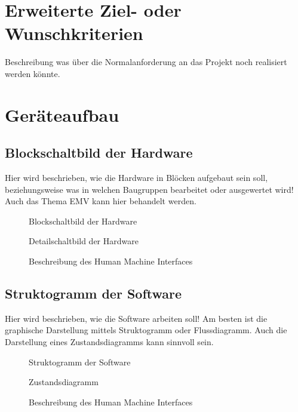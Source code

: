 \documentclass[12pt, draft]{article}
\begin{document}
\section{Erweiterte Ziel- oder Wunschkriterien}
Beschreibung was über die Normalanforderung an das Projekt noch realisiert werden könnte.

\section{Geräteaufbau}
\subsection{Blockschaltbild der Hardware}
Hier wird beschrieben, wie die Hardware in Blöcken aufgebaut sein soll, beziehungsweise was in welchen Baugruppen bearbeitet oder ausgewertet wird! \\
Auch das Thema EMV kann hier behandelt werden.
\begin{figure}[h]
    \centering
    \caption{Blockschaltbild der Hardware}
\end{figure}
\begin{figure}[h]
    \centering
    \caption{Detailschaltbild der Hardware}
\end{figure}
\begin{figure}[h]
    \centering
    \caption{Beschreibung des Human Machine Interfaces}
\end{figure}
\clearpage

\subsection{Struktogramm der Software}
Hier wird beschrieben, wie die Software arbeiten soll!
Am besten ist die graphische Darstellung mittels Struktogramm oder Flussdiagramm.
Auch die Darstellung eines Zustandsdiagramms kann sinnvoll sein.
\begin{figure}[h]
    \centering
    \caption{Struktogramm der Software}
\end{figure}
\begin{figure}[h]
    \centering
    \caption{Zustandsdiagramm}
\end{figure}
\begin{figure}[h]
    \centering
    \caption{Beschreibung des Human Machine Interfaces}
\end{figure}
\clearpage
\end{document}
